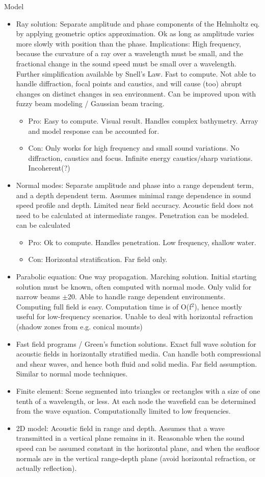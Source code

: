 Model
\begin{itemize}
\item Ray solution: Separate amplitude and phase components of the Helmholtz eq. by applying geometric optics approximation. Ok as long as amplitude varies more slowly with position than the phase. Implications: High frequency, because the curvature of a ray over a wavelength must be small, and the fractional change in the sound speed must be small over a wavelength. Further simplification available by Snell's Law. Fast to compute. Not able to handle diffraction, focal points and caustics, and will cause (too) abrupt changes on distinct changes in sea environment. Can be improved upon with fuzzy beam modeling / Gaussian beam tracing.
\begin{itemize}
\item Pro: Easy to compute. Visual result. Handles complex bathymetry. Array and model response can be accounted for.
\item Con: Only works for high frequency and small sound variations. No diffraction, caustics and focus. Infinite energy caustics/sharp variations. Incoherent(?)
\end{itemize}
\item Normal modes: Separate amplitude and phase into a range dependent term, and a depth dependent term. Assumes minimal range dependence in sound speed profile and depth. Limited near field accuracy. Acoustic field does not need to be calculated at intermediate ranges. Penetration can be modeled. can be calculated 
\begin{itemize}
\item Pro: Ok to compute. Handles penetration. Low frequency, shallow water.
\item Con: Horizontal stratification. Far field only. 
\end{itemize}
\item Parabolic equation: One way propagation. Marching solution. Initial starting solution must be known, often computed with normal mode. Only valid for narrow beams $\pm$20. Able to handle range dependent environments. Computing full field is easy. Computation time is of O(f$^2$), hence mostly useful for low-frequency scenarios. Unable to deal with horizontal refraction (shadow zones from e.g. conical mounts)
\item Fast field programs / Green's function solutions. Exact full wave solution for acoustic fields in horizontally stratified media. Can handle both compressional and shear waves, and hence both fluid and solid media. Far field assumption. Similar to normal mode techniques.
\item Finite element: Scene segmented into triangles or rectangles with a size of one tenth of a wavelength, or less. At each node the wavefield can be determined from the wave equation. Computationally limited to low frequencies.
\item 2D model: Acoustic field in range and depth. Assumes that a wave transmitted in a vertical plane remains in it. Reasonable when the sound speed can be assumed constant in the horizontal plane, and when the seafloor normals are in the vertical range-depth plane (avoid horizontal refraction, or actually reflection).
\end{itemize}


